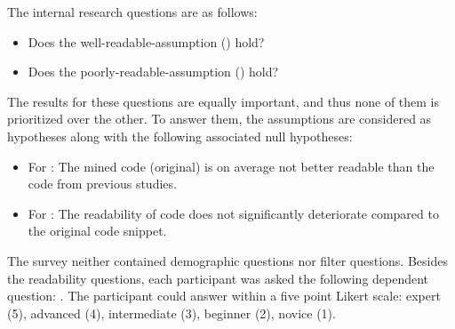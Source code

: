 \documentclass[%
class=scrreprt,
chapterprefix=false,%
open=right,%
twoside=false,%
paper=a4,%
logofile={Logo\_zentral\_farbig\_EN.png},%
thesistype=master,%
UKenglish,%
]{se2thesis}
\theoremstyle{definition}
\begin{document}
	The internal research questions are as follows:
	\begin{itemize}
		\item Does the well-readable-assumption () hold?
		\item Does the poorly-readable-assumption () hold?
	\end{itemize}
	
	The results for these questions are equally important, and thus none of them is prioritized over the other.
	To answer them, the assumptions	are considered as hypotheses along with the following associated null hypotheses:
	\begin{itemize}
		\item For : The mined code (original) is on average not better readable than the code from previous studies.
		\item For : The readability of code does not significantly deteriorate compared to the original code snippet.
	\end{itemize}
	
	The survey neither contained demographic questions nor filter questions. Besides the readability questions, each participant was asked the following dependent question: . The participant could answer within a five point Likert scale: expert (5), advanced (4), intermediate (3), beginner (2), novice (1).
	
\end{document}
